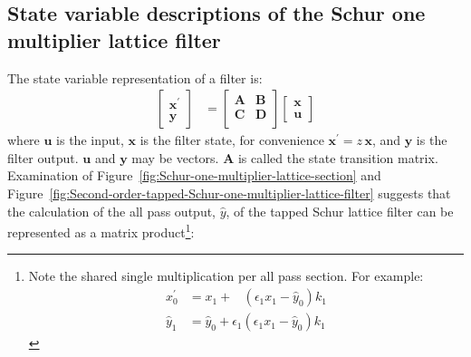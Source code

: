 \documentclass[a4paper,twoside,10pt,english]{article}
\begin{document}
\subsection{State variable descriptions of the Schur one multiplier lattice filter}
The state variable representation of a filter is:
\begin{align}
\left[\begin{array}{c}
\mathbf{x}^{\prime}\\
\mathbf{y}\end{array}\right] &= \left[\begin{array}{cc}
    \mathbf{A} & \mathbf{B} \\
    \mathbf{C} & \mathbf{D} \\
\end{array}\right]\left[\begin{array}{c}
\mathbf{x}\\
\mathbf{u}\end{array}\right]
\label{eqn:State-variable-representation}
\end{align}
where $\mathbf{u}$ is the input, $\mathbf{x}$ is the filter state, for
convenience $\mathbf{x}^{\prime}=z\,\mathbf{x}$, and $\mathbf{y}$ is the filter
output. $\mathbf{u}$ and $\mathbf{y}$ may be vectors. $\mathbf{A}$ is called
the state transition matrix.
Examination of Figure~\ref{fig:Schur-one-multiplier-lattice-section} and
Figure~\ref{fig:Second-order-tapped-Schur-one-multiplier-lattice-filter}
suggests that the calculation of the all pass output, $\hat{y}$, of the
tapped Schur lattice filter can be represented as a matrix product\footnote{Note
  the shared single multiplication per all pass section. For example:
  \begin{align*}
    x_{0}^{\prime} &= x_{1}+
      \phantom{\epsilon_{1}}\left(\epsilon_{1}x_{1}-\hat{y}_{0}\right)k_{1} \\
    \hat{y}_{1} &=\hat{y}_{0}+
      \epsilon_{1}\left(\epsilon_{1}x_{1}-\hat{y}_{0}\right)k_{1}
  \end{align*}}:
\end{document}
